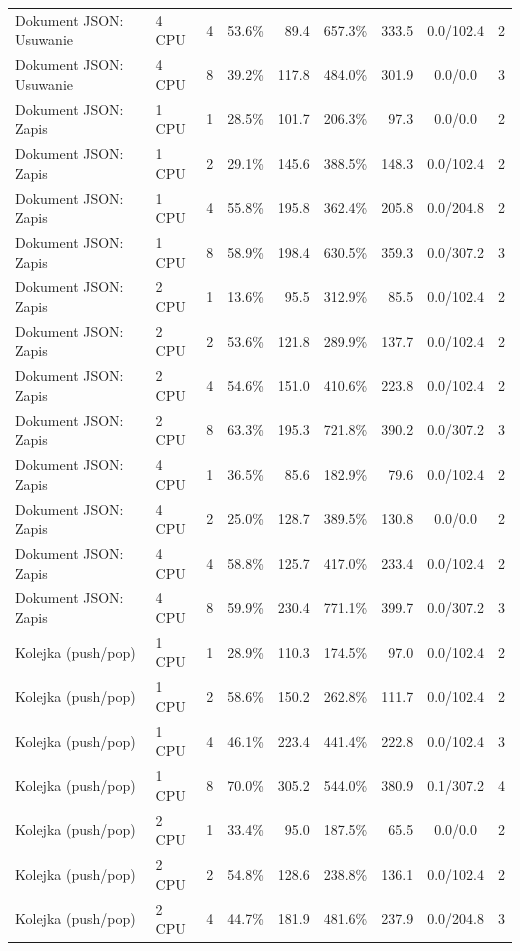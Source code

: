 \begin{table}[ht]
{\begin{tabular}{llcrrrrcc}
Dokument JSON: Usuwanie & 4 CPU & 4 & 53.6\% & 89.4 & 657.3\% & 333.5 & 0.0/102.4 & 2 \\
Dokument JSON: Usuwanie & 4 CPU & 8 & 39.2\% & 117.8 & 484.0\% & 301.9 & 0.0/0.0 & 3 \\
Dokument JSON: Zapis & 1 CPU & 1 & 28.5\% & 101.7 & 206.3\% & 97.3 & 0.0/0.0 & 2 \\
Dokument JSON: Zapis & 1 CPU & 2 & 29.1\% & 145.6 & 388.5\% & 148.3 & 0.0/102.4 & 2 \\
Dokument JSON: Zapis & 1 CPU & 4 & 55.8\% & 195.8 & 362.4\% & 205.8 & 0.0/204.8 & 2 \\
Dokument JSON: Zapis & 1 CPU & 8 & 58.9\% & 198.4 & 630.5\% & 359.3 & 0.0/307.2 & 3 \\
Dokument JSON: Zapis & 2 CPU & 1 & 13.6\% & 95.5 & 312.9\% & 85.5 & 0.0/102.4 & 2 \\
Dokument JSON: Zapis & 2 CPU & 2 & 53.6\% & 121.8 & 289.9\% & 137.7 & 0.0/102.4 & 2 \\
Dokument JSON: Zapis & 2 CPU & 4 & 54.6\% & 151.0 & 410.6\% & 223.8 & 0.0/102.4 & 2 \\
Dokument JSON: Zapis & 2 CPU & 8 & 63.3\% & 195.3 & 721.8\% & 390.2 & 0.0/307.2 & 3 \\
Dokument JSON: Zapis & 4 CPU & 1 & 36.5\% & 85.6 & 182.9\% & 79.6 & 0.0/102.4 & 2 \\
Dokument JSON: Zapis & 4 CPU & 2 & 25.0\% & 128.7 & 389.5\% & 130.8 & 0.0/0.0 & 2 \\
Dokument JSON: Zapis & 4 CPU & 4 & 58.8\% & 125.7 & 417.0\% & 233.4 & 0.0/102.4 & 2 \\
Dokument JSON: Zapis & 4 CPU & 8 & 59.9\% & 230.4 & 771.1\% & 399.7 & 0.0/307.2 & 3 \\
Kolejka (push/pop) & 1 CPU & 1 & 28.9\% & 110.3 & 174.5\% & 97.0 & 0.0/102.4 & 2 \\
Kolejka (push/pop) & 1 CPU & 2 & 58.6\% & 150.2 & 262.8\% & 111.7 & 0.0/102.4 & 2 \\
Kolejka (push/pop) & 1 CPU & 4 & 46.1\% & 223.4 & 441.4\% & 222.8 & 0.0/102.4 & 3 \\
Kolejka (push/pop) & 1 CPU & 8 & 70.0\% & 305.2 & 544.0\% & 380.9 & 0.1/307.2 & 4 \\
Kolejka (push/pop) & 2 CPU & 1 & 33.4\% & 95.0 & 187.5\% & 65.5 & 0.0/0.0 & 2 \\
Kolejka (push/pop) & 2 CPU & 2 & 54.8\% & 128.6 & 238.8\% & 136.1 & 0.0/102.4 & 2 \\
Kolejka (push/pop) & 2 CPU & 4 & 44.7\% & 181.9 & 481.6\% & 237.9 & 0.0/204.8 & 3 \\

\end{tabular}}
\end{table}
